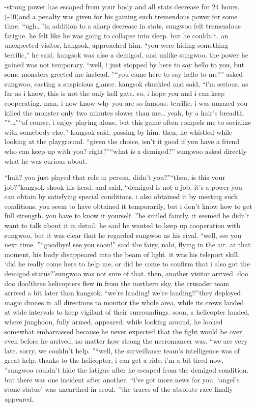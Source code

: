 -strong power has escaped from your body and all stats decrease for 24 hours.
 (-10)and a penalty was given for his gaining such tremendous power for some time.
“ugh…”in addition to a sharp decrease in stats, sungwoo felt tremendous fatigue.
 he felt like he was going to collapse into sleep.
but he couldn’t.
 an unexpected visitor, kangsok, approached him.
“you were hiding something terrific,” he said.
kangsok was also a demigod.
 and unlike sungwoo, the power he gained was not temporary.
“well, i just stopped by here to say hello to you, but some monsters greeted me instead.
”“you came here to say hello to me?” asked sungwoo, casting a suspicious glance.
kangsok chuckled and said, “i’m serious.
 as far as i know, this is not the only hell gate.
 so, i hope you and i can keep cooperating.
 man, i now know why you are so famous.
 terrific.
 i was amazed you killed the monster only two minutes slower than me… yeah, by a hair’s breadth.
”“…”“of course, i enjoy playing alone, but this game often compels me to socialize with somebody else,” kangsok said, passing by him.
then, he whistled while looking at the playground.
“given the choice, isn’t it good if you have a friend who can keep up with you? right?”“what is a demigod?” sungwoo asked directly what he was curious about.


“huh? you just played that role in person, didn’t you?”“then, is this your job?”kangsok shook his head, and said, “demigod is not a job.
 it’s a power you can obtain by satisfying special conditions.
 i also obtained it by meeting such conditions.
 you seem to have obtained it temporarily, but i don’t know how to get full strength.
 you have to know it yourself.
”he smiled faintly.
 it seemed he didn’t want to talk about it in detail.
 he said he wanted to keep up cooperation with sungwoo, but it was clear that he regarded sungwoo as his rival.
“well, see you next time.
”“goodbye! see you soon!” said the fairy, nabi, flying in the air.
at that moment, his body disappeared into the beam of light.
 it was his teleport skill.
‘did he really come here to help me, or did he come to confirm that i also got the demigod status?’sungwoo was not sure of that.
then, another visitor arrived.
doo doo doo!three helicopters flew in from the northern sky.
 the crusader team arrived a bit later than kangsok.
“we’re landing! we’re landing!!”they deployed magic drones in all directions to monitor the whole area, while its crews landed at wide intervals to keep vigilant of their surroundings.
soon, a helicopter landed, where junghoon, fully armed, appeared.
while looking around, he looked somewhat embarrassed because he never expected that the fight would be over even before he arrived, no matter how strong the necromancer was.
“we are very late.
 sorry, we couldn’t help.
”“well, the surveillance team’s intelligence was of great help.
 thanks to the helicopter, i can get a ride.
 i’m a bit tired now.
”sungwoo couldn’t hide the fatigue after he escaped from the demigod condition.
but there was one incident after another.
“i’ve got more news for you.
 ‘angel’s stone statue’ was unearthed in seoul.
”the traces of the absolute race finally appeared.


 